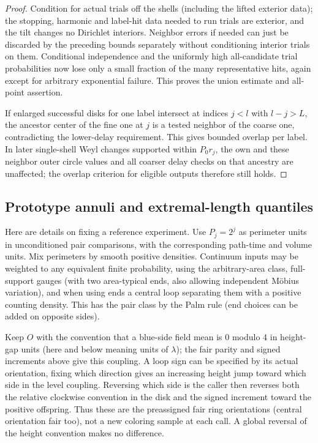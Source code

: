 \begin{proof}
Condition for actual trials off the shells (including the lifted exterior data); the stopping,
harmonic and label-hit data needed to run trials are exterior, and the tilt changes no Dirichlet
interiors. Neighbor errors if needed can just be discarded by the preceding bounds separately
without conditioning interior trials on them. Conditional independence and the uniformly high
all-candidate trial probabilities now lose only a small fraction of the many representative hits,
again except for arbitrary exponential failure. This proves the union estimate and all-point
assertion.

If enlarged successful disks for one label intersect at indices \(j<l\) with \(l-j>L\), the ancestor
center of the fine one at \(j\) is a tested neighbor of the coarse one, contradicting the
lower-delay requirement. This gives bounded overlap per label. In later single-shell Weyl changes
supported within \(P_0 r_j\), the own and these neighbor outer circle values and all coarser delay
checks on that ancestry are unaffected; the overlap criterion for eligible outputs therefore still
holds.

\end{proof}

\subsection{Prototype annuli and extremal-length quantiles}
\label{conf:el-setup}

Here are details on fixing a reference experiment. Use \(P_j=2^j\) as perimeter units in
unconditioned pair comparisons, with the corresponding path-time and volume units. Mix perimeters by
smooth positive densities. Continuum inputs may be weighted to any equivalent finite probability,
using the arbitrary-area class, full-support gauges (with two area-typical ends, also allowing
independent Möbius variation), and when using ends a central loop separating them with a positive
counting density. This has the pair class by the Palm rule (end choices can be added on opposite
sides).

Keep \(O\) with the convention that a blue-side field mean is 0 modulo 4 in height-gap units (here
and below meaning units of \(\lambda\)); the fair parity and signed increments above give this
coupling. A loop sign can be specified by its actual orientation, fixing which direction gives an
increasing height jump toward which side in the level coupling. Reversing which side is the caller
then reverses both the relative clockwise convention in the disk and the signed increment toward the
positive offspring. Thus these are the preassigned fair ring orientations (central orientation fair
too), not a new coloring sample at each call. A global reversal of the height convention makes no
difference.

